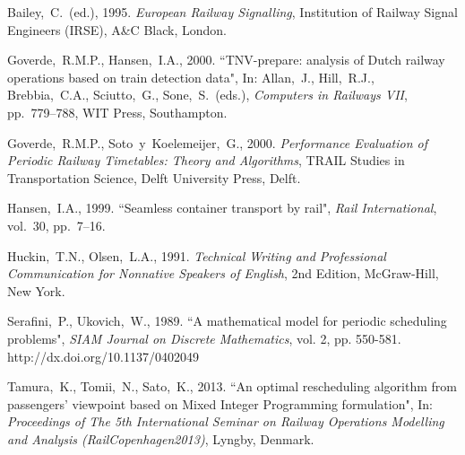 \documentclass[10pt,a4paper,oneside,onecolumn]{article}
\begin{document}
\begin{thebibliography}{99}
	\setlength{\itemsep}{0\parskip}
	
	Bailey,~C.~(ed.), 1995. 
	{\em European Railway Signalling}, 
	Institution of Railway Signal Engineers (IRSE), 
	A\&C Black, London.
	
	Goverde,~R.M.P., Hansen,~I.A., 2000. 
	``TNV-prepare: analysis of Dutch railway operations 
	based on train detection data", 
	In: Allan,~J., Hill,~R.J., Brebbia,~C.A., Sciutto,~G., Sone,~S.~(eds.), 
	{\em Computers in Railways VII}, 
	pp.~779--788, 
	WIT Press, Southampton.
	
	Goverde,~R.M.P., Soto~y~Koelemeijer,~G., 2000. 
	{\em Performance Evaluation of Periodic Railway Timetables: 
		Theory and Algorithms},
	TRAIL Studies in Transportation Science, 
	Delft University Press, Delft.
	
	Hansen,~I.A., 1999. 
	``Seamless container transport by rail", 
	{\em Rail International}, 
	vol.~30, pp.~7--16.
	
	Huckin,~T.N., Olsen,~L.A., 1991. 
	{\em Technical Writing and Professional Communication 
		for Nonnative Speakers of English}, 
	2nd Edition, McGraw-Hill, New York.
	
	Serafini,~P., Ukovich,~W., 1989. 
	``A mathematical model for periodic scheduling problems", 
	{\em SIAM Journal on Discrete Mathematics}, 
	vol. 2, pp. 550-581. 
	http://dx.doi.org/10.1137/0402049
	
	Tamura,~K., Tomii,~N., Sato,~K., 2013. 
	``An optimal rescheduling algorithm from passengers' viewpoint 
	based on Mixed Integer Programming formulation", 
	In: {\em Proceedings of The 5th International Seminar 
		on Railway Operations Modelling and Analysis (RailCopenhagen2013)}, 
	Lyngby, Denmark.
\end{thebibliography}

\end{document}
